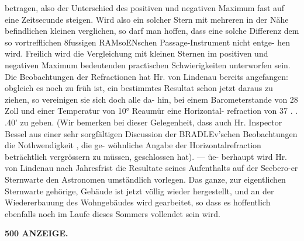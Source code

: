 \documentclass[12pt,a4paper]{article}
\begin{document}
betragen, also  der  Unterschied  des  positiven  und  negativen  Maximum  fast  auf  eine  Zeitsecunde  steigen.  Wird also  ein  solcher  Stern  mit  mehreren  in  der  Nähe  befindlichen  kleinen  verglichen,  so  darf  man  hoffen, dass  eine  solche  Differenz  dem  so  vortrefflichen  8fussigen  RAMsoENschen  Passage-Instrument  nicht  entge- hen wird.  Freilich  wird  die  Vergleichung  mit  kleinen  Sternen  im  positiven  und  negativen  Maximum bedeutenden  practischen  Schwierigkeiten  unterworfen  sein. Die  Beobachtungen  der  Refractionen  hat  Hr.  von  Lindenau  bereits  angefangen:  obgleich  es  noch zu  früh  ist,  ein  bestimmtes  Resultat  schon  jetzt  daraus  zu  ziehen,  so  vereinigen  sie  sich  doch  alle  da- hin, bei  einem  Barometerstande  von  28  Zoll  und  einer  Temperatur  von  10°  Reaumür  eine  Horizontal- refraction  von  37  .  .  .40'  zu  geben.  (Wir  bemerken  bei  dieser  Gelegenheit,  dass  auch  Hr.  Inspector  Bessel aus  einer  sehr  sorgfältigen  Discussion  der  BRADLEv'schen  Beobachtungen  die  Nothwendigkeit ,  die  ge- wöhnliche Angabe  der  Horizontalrefraction  beträchtlich  vergrössern  zu  müssen,  geschlossen  hat).  ---  üe- berhaupt  wird  Hr.  von  Lindenau  nach  Jahresfrist  die  Resultate  seines  Aufenthalts  auf  der  Seebero-er Sternwarte  den  Astronomen  umständlich  vorlegen. Das  ganze,  zur  eigentlichen  Sternwarte  gehörige,  Gebäude  ist  jetzt  völlig  wieder  hergestellt,  und an  der  Wiedererbauung  des  Wohngebäudes  wird  gearbeitet,  so  dass  es  hoffentlich  ebenfalls  noch  im Laufe  dieses  Sommers  vollendet  sein  wird.

\vspace{0.5em}


\noindent\textbf{500  ANZEIGE.}
\end{document}

